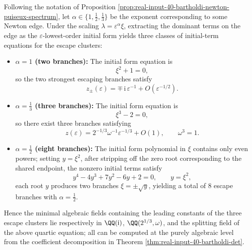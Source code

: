 \begin{proposition}\label{prop:real-input-40-bartholdi-escape-initial-forms}
Following the notation of Proposition \ref{prop:real-input-40-bartholdi-newton-puiseux-spectrum}, let \(\alpha\in\{1,\tfrac12,\tfrac13\}\) be the exponent corresponding to some Newton edge.
Under the scaling \(\lambda=\varepsilon^{\alpha}\xi\), extracting the dominant terms on the edge as the \(\varepsilon\)-lowest-order initial form yields three classes of initial-term equations for the escape clusters:
\begin{itemize}
  \item \textbf{\(\alpha=1\) (two branches):}
  The initial form equation is
  \[
  \xi^2+1=0,
  \]
  so the two strongest escaping branches satisfy
  \[
  z_{\pm}(\varepsilon)=\mp\,\mathrm{i}\,\varepsilon^{-1}+O\!\left(\varepsilon^{-1/2}\right).
  \]
  \item \textbf{\(\alpha=\tfrac13\) (three branches):}
  The initial form equation is
  \[
  \xi^3-2=0,
  \]
  so there exist three branches satisfying
  \[
  z(\varepsilon)=2^{-1/3}\omega^{-1}\varepsilon^{-1/3}+O(1),\qquad \omega^3=1.
  \]
  \item \textbf{\(\alpha=\tfrac12\) (eight branches):}
  The initial form polynomial in \(\xi\) contains only even powers; setting \(y=\xi^2\), after stripping off the zero root corresponding to the shared endpoint, the nonzero initial terms satisfy
  \[
  y^4-4y^3+7y^2-6y+2=0,\qquad y=\xi^2,
  \]
  each root \(y\) produces two branches \(\xi=\pm\sqrt{y}\), yielding a total of \(8\) escape branches with \(\alpha=\tfrac12\).
\end{itemize}
Hence the minimal algebraic fields containing the leading constants of the three escape clusters lie respectively in \(\QQ(\mathrm{i})\), \(\QQ(2^{1/3},\omega)\), and the splitting field of the above quartic equation; all can be computed at the purely algebraic level from the coefficient decomposition in Theorem \ref{thm:real-input-40-bartholdi-det}.
\end{proposition}
